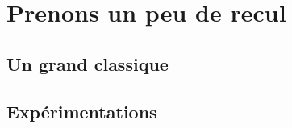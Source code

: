 \documentclass[12pt]{amsart}
\begin{document}






\section{Prenons un peu de recul} \label{general-case}

\subsection{Un grand classique}




\subsection{Expérimentations}




%
%
\end{document}

